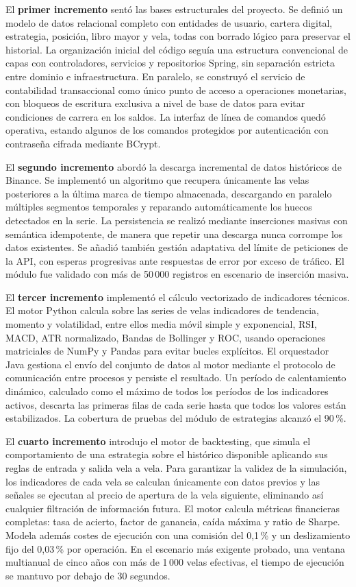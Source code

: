 El \textbf{primer incremento} sentó las bases estructurales del proyecto. Se definió un modelo de datos relacional completo con entidades de usuario, cartera digital, estrategia, posición, libro mayor y vela, todas con borrado lógico para preservar el historial. La organización inicial del código seguía una estructura convencional de capas con controladores, servicios y repositorios Spring, sin separación estricta entre dominio e infraestructura. En paralelo, se construyó el servicio de contabilidad transaccional como único punto de acceso a operaciones monetarias, con bloqueos de escritura exclusiva a nivel de base de datos para evitar condiciones de carrera en los saldos. La interfaz de línea de comandos quedó operativa, estando algunos de los comandos protegidos por autenticación con contraseña cifrada mediante BCrypt.

El \textbf{segundo incremento} abordó la descarga incremental de datos históricos de Binance. Se implementó un algoritmo que recupera únicamente las velas posteriores a la última marca de tiempo almacenada, descargando en paralelo múltiples segmentos temporales y reparando automáticamente los huecos detectados en la serie. La persistencia se realizó mediante inserciones masivas con semántica idempotente, de manera que repetir una descarga nunca corrompe los datos existentes. Se añadió también gestión adaptativa del límite de peticiones de la API, con esperas progresivas ante respuestas de error por exceso de tráfico. El módulo fue validado con más de 50\,000 registros en escenario de inserción masiva.

El \textbf{tercer incremento} implementó el cálculo vectorizado de indicadores técnicos. El motor Python calcula sobre las series de velas indicadores de tendencia, momento y volatilidad, entre ellos media móvil simple y exponencial, RSI, MACD, ATR normalizado, Bandas de Bollinger y ROC, usando operaciones matriciales de NumPy y Pandas para evitar bucles explícitos. El orquestador Java gestiona el envío del conjunto de datos al motor mediante el protocolo de comunicación entre procesos y persiste el resultado. Un período de calentamiento dinámico, calculado como el máximo de todos los períodos de los indicadores activos, descarta las primeras filas de cada serie hasta que todos los valores están estabilizados. La cobertura de pruebas del módulo de estrategias alcanzó el 90\,\%.

El \textbf{cuarto incremento} introdujo el motor de backtesting, que simula el comportamiento de una estrategia sobre el histórico disponible aplicando sus reglas de entrada y salida vela a vela. Para garantizar la validez de la simulación, los indicadores de cada vela se calculan únicamente con datos previos y las señales se ejecutan al precio de apertura de la vela siguiente, eliminando así cualquier filtración de información futura. El motor calcula métricas financieras completas: tasa de acierto, factor de ganancia, caída máxima y ratio de Sharpe. Modela además costes de ejecución con una comisión del 0,1\,\% y un deslizamiento fijo del 0,03\,\% por operación. En el escenario más exigente probado, una ventana multianual de cinco años con más de 1\,000 velas efectivas, el tiempo de ejecución se mantuvo por debajo de 30 segundos.

